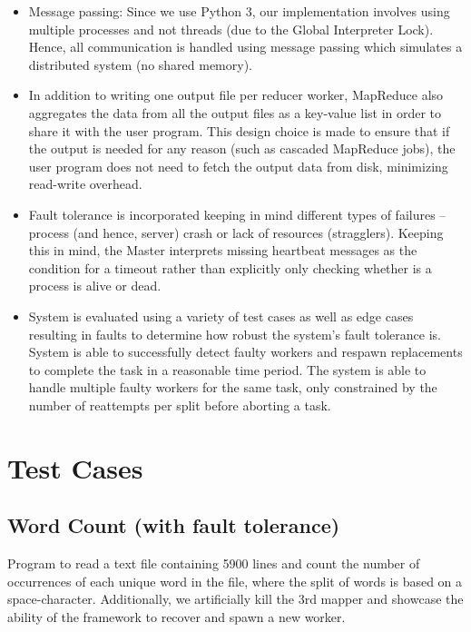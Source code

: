 \documentclass[a4paper,12pt]{article}
\begin{document}
\begin{itemize}
    \item Message passing: Since we use Python 3, our implementation involves using multiple processes and not threads (due to the Global Interpreter Lock). Hence, all communication is handled using message passing which simulates a distributed system (no shared memory). 
    \item In addition to writing one output file per reducer worker, MapReduce also aggregates the data from all the output files as a key-value list in order to share it with the user program. This design choice is made to ensure that if the output is needed for any reason (such as cascaded MapReduce jobs), the user program does not need to fetch the output data from disk, minimizing read-write overhead.
    \item Fault tolerance is incorporated keeping in mind different types of failures -- process (and hence, server) crash or lack of resources (stragglers). Keeping this in mind, the Master interprets missing heartbeat messages as the condition for a timeout rather than explicitly only checking whether is a process is alive or dead.
    \item System is evaluated using a variety of test cases as well as edge cases resulting in faults to determine how robust the system's fault tolerance is. System is able to successfully detect faulty workers and respawn replacements to complete the task in a reasonable time period. The system is able to handle multiple faulty workers for the same task, only constrained by the number of reattempts per split before aborting a task.
    
\end{itemize}

\section{Test Cases}

\subsection{Word Count \textbf{(with fault tolerance)}}
Program to read a text file containing 5900 lines and count the number of occurrences of each unique word in the file, where the split of words is based on a space-character. Additionally, we artificially kill the 3rd mapper and showcase the ability of the framework to recover and spawn a new worker. \newline
\end{document}
